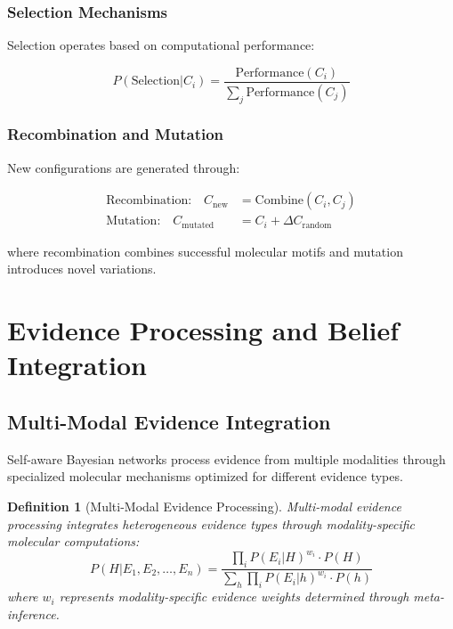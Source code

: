 \documentclass[12pt,a4paper]{article}
\newtheorem{definition}[theorem]{Definition}
\begin{document}
\subsubsection{Selection Mechanisms}

Selection operates based on computational performance:

\begin{equation}
P(\text{Selection} | C_i) = \frac{\text{Performance}(C_i)}{\sum_j \text{Performance}(C_j)}
\end{equation}

\subsubsection{Recombination and Mutation}

New configurations are generated through:

\begin{align}
\text{Recombination:} \quad C_{\text{new}} &= \text{Combine}(C_i, C_j) \\
\text{Mutation:} \quad C_{\text{mutated}} &= C_i + \Delta C_{\text{random}}
\end{align}

where recombination combines successful molecular motifs and mutation introduces novel variations.

\section{Evidence Processing and Belief Integration}

\subsection{Multi-Modal Evidence Integration}

Self-aware Bayesian networks process evidence from multiple modalities through specialized molecular mechanisms optimized for different evidence types.

\begin{definition}[Multi-Modal Evidence Processing]
Multi-modal evidence processing integrates heterogeneous evidence types through modality-specific molecular computations:
\begin{equation}
P(H | E_1, E_2, \ldots, E_n) = \frac{\prod_i P(E_i | H)^{w_i} \cdot P(H)}{\sum_h \prod_i P(E_i | h)^{w_i} \cdot P(h)}
\end{equation}
where $w_i$ represents modality-specific evidence weights determined through meta-inference.
\end{definition}
\end{document}
